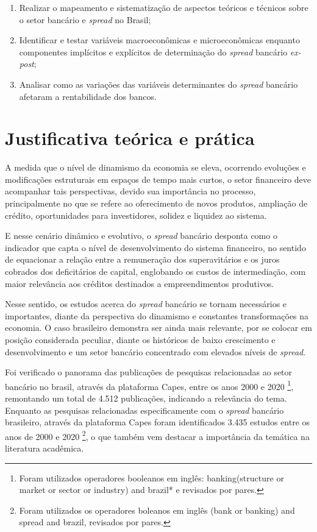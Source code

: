 \documentclass[
  12pt,
  12pt,
  openright,
  oneside,
  a4paper,
  chapter=TITLE,
  section=TITLE,
  subsection=TITLE,
  subsubsection=TITLE,
  english,
  portugues,
  sumario=tradicional]{abntex2}
\providecommand{\tightlist}{%
  \setlength{\itemsep}{0pt}\setlength{\parskip}{0pt}}
\begin{document}
\begin{enumerate}
\def\labelenumi{\arabic{enumi}.}
\tightlist
\item
  Realizar o mapeamento e sistematização de aspectos teóricos e técnicos sobre o setor bancário e \emph{spread} no Brasil;
\item
  Identificar e testar variáveis macroeconômicas e microeconômicas enquanto componentes implícitos e explícitos de determinação do \emph{spread} bancário \emph{ex-post};
\item
  Analisar como as variações das variáveis determinantes do \emph{spread} bancário afetaram a rentabilidade dos bancos.
\end{enumerate}

\section{Justificativa teórica e prática}

A medida que o nível de dinamismo da economia se eleva, ocorrendo evoluções e modificações estruturais em espaços de tempo mais curtos, o setor financeiro deve acompanhar tais perspectivas, devido sua importância no processo, principalmente no que se refere ao oferecimento de novos produtos, ampliação de crédito, oportunidades para investidores, solidez e liquidez ao sistema.

E nesse cenário dinâmico e evolutivo, o \emph{spread} bancário desponta como o indicador que capta o nível de desenvolvimento do sistema financeiro, no sentido de equacionar a relação entre a remuneração dos superavitários e os juros cobrados dos deficitários de capital, englobando os custos de intermediação, com maior relevância aos créditos destinados a empreendimentos produtivos.

Nesse sentido, os estudos acerca do \emph{spread} bancário se tornam necessários e importantes, diante da perspectiva do dinamismo e constantes transformações na economia. O caso brasileiro demonstra ser ainda mais relevante, por se colocar em posição considerada peculiar, diante os históricos de baixo crescimento e desenvolvimento e um setor bancário concentrado com elevados níveis de \emph{spread}.

Foi verificado o panorama das publicações de pesquisas relacionadas ao setor bancário no brasil, através da plataforma Capes, entre os anos 2000 e 2020
\footnote{Foram utilizados operadores booleanos em inglês: banking(structure or
market or sector or industry) and brazil* e revisados por pares.}, remontando um total de 4.512 publicações, indicando a relevância do tema. Enquanto as pesquisas relacionadas especificamente com o \emph{spread} bancário brasileiro, através da plataforma Capes foram identificados 3.435 estudos entre os anos de 2000 e 2020 \footnote{Foram utilizados os operadores boleanos em
inglês (bank or banking) and spread and brazil, revisados por pares.}, o que também vem destacar a importância da temática na literatura acadêmica.
\end{document}
